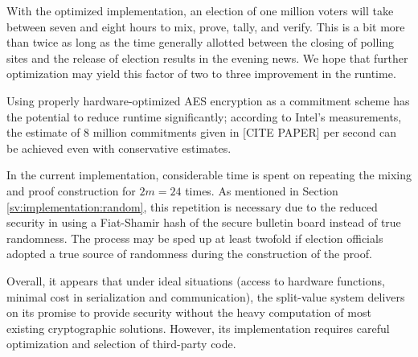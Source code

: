 With the optimized implementation, an election of one million voters will take between seven and eight hours to mix, prove, tally, and verify. This is a bit more than twice as long as the time generally allotted between the closing of polling sites and the release of election results in the evening news. We hope that further optimization may yield this factor of two to three improvement in the runtime.

Using properly hardware-optimized AES encryption as a commitment scheme has the potential to reduce runtime significantly; according to Intel's measurements, the estimate of 8 million commitments given in [CITE PAPER] per second can be achieved even with conservative estimates.

In the current implementation, considerable time is spent on repeating the mixing and proof construction for $2m = 24$ times. As mentioned in Section \ref{sv:implementation:random}, this repetition is necessary due to the reduced security in using a Fiat-Shamir hash of the secure bulletin board instead of true randomness. The process may be sped up at least twofold if election officials adopted a true source of randomness during the construction of the proof.

Overall, it appears that under ideal situations (access to hardware functions, minimal cost in serialization and communication), the split-value system delivers on its promise to provide security without the heavy computation of most existing cryptographic solutions. However, its implementation requires careful optimization and selection of third-party code.
